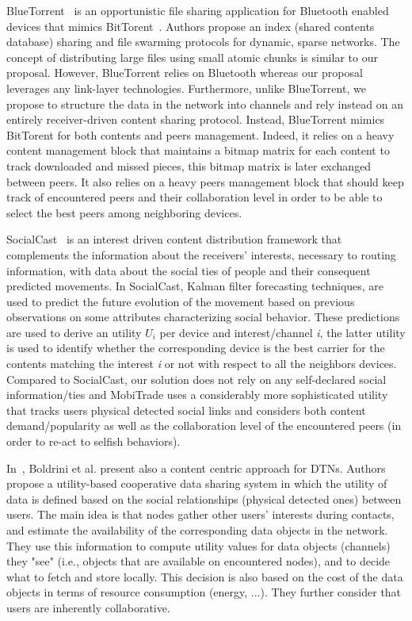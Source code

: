 BlueTorrent~\cite{BlueTorrent} is an opportunistic file sharing application for Bluetooth enabled devices that mimics BitTorent~\cite{RefBT}. Authors propose an index (shared contents database) sharing and file swarming protocols for dynamic, sparse networks. The concept of distributing large files using small atomic chunks is similar to our proposal. However, BlueTorrent relies on Bluetooth whereas our proposal leverages any link-layer technologies. Furthermore, unlike BlueTorrent, we propose to structure the data in the network into channels and rely instead on an entirely receiver-driven content sharing protocol. Instead, BlueTorrent mimics BitTorent for both contents and peers management. Indeed, it relies on a heavy content management block that maintains a bitmap matrix for each content to track downloaded and missed pieces, this bitmap matrix is later exchanged between peers. It also relies on a heavy peers management block that should keep track of encountered peers and their collaboration level in order to be able to select the best peers among neighboring devices.

SocialCast~\cite{SocialCast2, SocialCast} is an interest driven content distribution framework that complements the information about the receivers' interests, necessary to routing information, with data about the social ties of people and their consequent predicted movements. In SocialCast, Kalman filter forecasting techniques, are used to predict the future evolution of the movement based on previous observations on some attributes characterizing social behavior. These predictions are used to derive an utility $U_i$ per device and interest/channel \emph{i}, the latter utility is used to identify whether the corresponding device is the best carrier for the contents matching
the interest \emph{i} or not with respect to all the neighbors devices. Compared to SocialCast, our solution does not rely on any self-declared social information/ties and MobiTrade uses a considerably more sophisticated utility that tracks users physical detected social links and considers both content demand/popularity as well as the collaboration level of the encountered peers (in order to re-act to selfish behaviors).

In~\cite{Boldrini:2008:MDD}, Boldrini et al. present also a content centric approach for DTNs. Authors propose a utility-based cooperative data sharing system in which the utility of data is defined based on the social
relationships (physical detected ones) between users.  The main idea is that nodes gather other users' interests during contacts, and estimate the availability of the corresponding data objects in the network. They use this information to compute utility values for data objects (channels) they "see" (i.e., objects that are available on encountered nodes), and to decide what to fetch and store locally. This decision is also based on the cost of the data objects in terms of resource consumption (energy, ...). They further consider that users are inherently collaborative.

